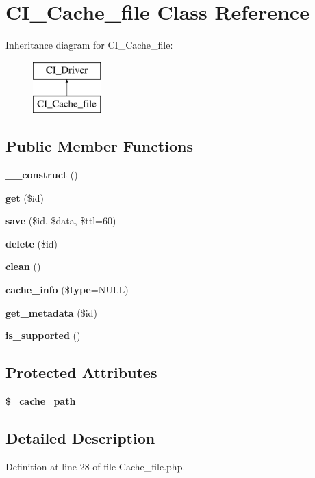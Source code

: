 \section{C\-I\-\_\-\-Cache\-\_\-file Class Reference}
\label{class_c_i___cache__file}
Inheritance diagram for C\-I\-\_\-\-Cache\-\_\-file\-:\begin{figure}[H]
\begin{center}
\leavevmode
\includegraphics[height=2.000000cm]{class_c_i___cache__file}
\end{center}
\end{figure}
\subsection*{Public Member Functions}
\begin{DoxyCompactItemize}
\item 
{\bf \-\_\-\-\_\-construct} ()
\item 
{\bf get} (\$id)
\item 
{\bf save} (\$id, \$data, \$ttl=60)
\item 
{\bf delete} (\$id)
\item 
{\bf clean} ()
\item 
{\bf cache\-\_\-info} (\${\bf type}=N\-U\-L\-L)
\item 
{\bf get\-\_\-metadata} (\$id)
\item 
{\bf is\-\_\-supported} ()
\end{DoxyCompactItemize}
\subsection*{Protected Attributes}
\begin{DoxyCompactItemize}
\item 
{\bf \$\-\_\-cache\-\_\-path}
\end{DoxyCompactItemize}


\subsection{Detailed Description}


Definition at line 28 of file Cache\-\_\-file.\-php.



